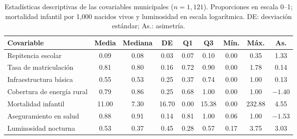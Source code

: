 \begin{table}[!htbp]
\centering
\scriptsize
\caption{Estadísticas descriptivas de las covariables municipales
($n=1{,}121$). Proporciones en escala 0--1; mortalidad infantil
por 1{,}000 nacidos vivos y luminosidad en escala logarítmica.
DE: desviación estándar; As.: asimetría.}
\label{tab:eda-municipal}
\renewcommand{\arraystretch}{1.1}
\setlength{\tabcolsep}{3pt}
\begin{tabular}{l c c c c c c c c}
\hline
Covariable & Media & Mediana & DE & Q1 & Q3 & Mín. & Máx. & As. \\
\hline
Repitencia escolar & 0.09 & 0.08 & 0.03 & 0.07 & 0.10 & 0.00 & 0.35 & 1.33 \\
Tasa de matriculación & 0.81 & 0.80 & 0.16 & 0.72 & 0.90 & 0.00 & 1.78 & 0.14 \\
Infraestructura básica & 0.55 & 0.53 & 0.25 & 0.37 & 0.74 & 0.00 & 1.00 & 0.13 \\
Cobertura de energía rural & 0.79 & 0.86 & 0.25 & 0.68 & 1.00 & 0.00 & 1.00 & $-1.40$ \\
Mortalidad infantil & 11.00 & 7.30 & 16.70 & 0.00 & 15.38 & 0.00 & 232.88 & 4.55 \\
Aseguramiento en salud & 0.88 & 0.91 & 0.14 & 0.81 & 1.00 & 0.06 & 1.00 & $-1.53$ \\
Luminosidad nocturna & 0.53 & 0.37 & 0.45 & 0.28 & 0.57 & 0.17 & 3.75 & 3.03 \\
\hline
\end{tabular}
\end{table}

